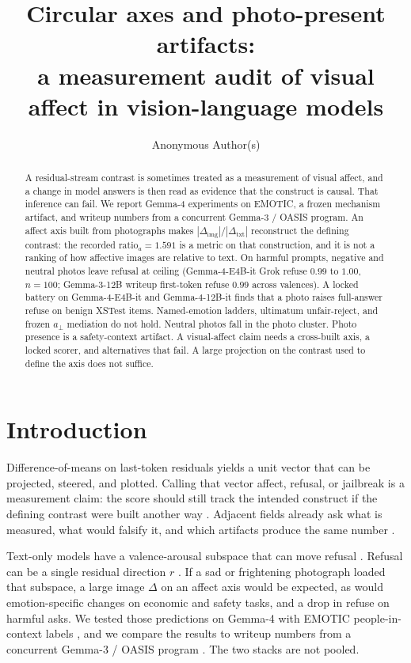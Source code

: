 \documentclass{article}
\title{Circular axes and photo-present artifacts:\\
a measurement audit of visual affect in vision-language models}
\author{Anonymous Author(s)}
\begin{document}
\maketitle

\begin{abstract}
A residual-stream contrast is sometimes treated as a measurement of visual affect, and a change in model answers is then read as evidence that the construct is causal. That inference can fail. We report Gemma-4 experiments on EMOTIC, a frozen mechanism artifact, and writeup numbers from a concurrent Gemma-3 / OASIS program. An affect axis built from photographs makes $|\Delta_{\mathrm{img}}|/|\Delta_{\mathrm{txt}}|$ reconstruct the defining contrast: the recorded $\mathrm{ratio}_a=1.591$ is a metric on that construction, and it is not a ranking of how affective images are relative to text. On harmful prompts, negative and neutral photos leave refusal at ceiling (Gemma-4-E4B-it Grok refuse $0.99$ to $1.00$, $n=100$; Gemma-3-12B writeup first-token refuse $0.99$ across valences). A locked battery on Gemma-4-E4B-it and Gemma-4-12B-it finds that a photo raises full-answer refuse on benign XSTest items. Named-emotion ladders, ultimatum unfair-reject, and frozen $a_\perp$ mediation do not hold. Neutral photos fall in the photo cluster. Photo presence is a safety-context artifact. A visual-affect claim needs a cross-built axis, a locked scorer, and alternatives that fail. A large projection on the contrast used to define the axis does not suffice.
\end{abstract}

\section{Introduction}
\label{sec:intro}

Difference-of-means on last-token residuals yields a unit vector that can be projected, steered, and plotted. Calling that vector affect, refusal, or jailbreak is a measurement claim: the score should still track the intended construct if the defining contrast were built another way \citep{cronbach1955construct,messick1995validity,borsboom2004concept}. Adjacent fields already ask what is measured, what would falsify it, and which artifacts produce the same number \citep{doshi2017towards,lipton2018mythos}.

Text-only models have a valence-arousal subspace that can move refusal \citep{sun2026valence}. Refusal can be a single residual direction $r$ \citep{arditi2024refusal}. If a sad or frightening photograph loaded that subspace, a large image $\Delta$ on an affect axis would be expected, as would emotion-specific changes on economic and safety tasks, and a drop in refuse on harmful asks. We tested those predictions on Gemma-4 \citep{gemmateam2026gemma4} with EMOTIC people-in-context labels \citep{kosti2017emotion,kosti2019emotic}, and we compare the results to writeup numbers from a concurrent Gemma-3 / OASIS program \citep{gemmateam2025gemma3,kurdi2017oasis}. The two stacks are not pooled.
\end{document}
